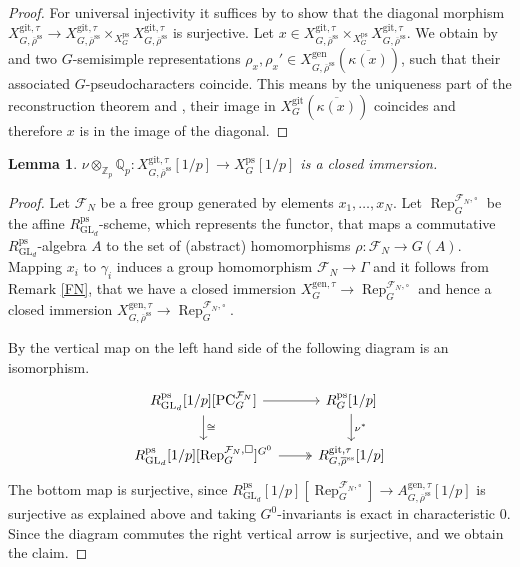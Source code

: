 \documentclass{amsart}
\newtheorem{lem}[prop]{Lemma}
\theoremstyle{definition}
\theoremstyle{remark}
\newcommand{\stackcite}[1]{\cite[\href{https://stacks.math.columbia.edu/tag/#1}{Tag #1}]{stacks-project}}
\DeclareMathOperator{\GL}{GL}
\DeclareMathOperator{\Rep}{Rep}
\newcommand{\Qp}{\mathbb {Q}_p}
\newcommand{\Zp}{\mathbb{Z}_p}
\newcommand{\rhobar}{\overline{\rho}}
\newcommand{\ps}{\mathrm{ps}}
\newcommand{\gen}{\mathrm{gen}}
\newcommand{\gps}{\mathrm{git}}
\newcommand{\RpsGLd}{R^{\ps}_{\GL_d}}
\newcommand{\XgpsG}{X^{\gps}_{G}}
\newcommand{\rhobarss}{\rhobar^{\mathrm{ss}}}
\newcommand{\PC}{\mathrm{PC}}
\begin{document}
\begin{proof}
    For universal injectivity it suffices by \stackcite{01S4} to show that the diagonal morphism $X^{\gps,\tau}_{G,\rhobarss} \to X^{\gps,\tau}_{G,\rhobarss} \times_{X^{\ps}_G} X^{\gps,\tau}_{G,\rhobarss}$ is surjective. Let $x \in X^{\gps,\tau}_{G,\rhobarss} \times_{X^{\ps}_G} X^{\gps,\tau}_{G,\rhobarss}$. We obtain by  and  two $G$-semisimple representations $\rho_x, \rho_x' \in X^{\gen}_{G, \rhobarss}(\overline{\kappa(x)})$, such that their associated $G$-pseudocharacters coincide. This means by the uniqueness part of the reconstruction theorem  and , their image in $\XgpsG(\overline{\kappa(x)})$ coincides and therefore $x$ is in the image of the diagonal.
\end{proof}

\begin{lem}\label{nu_cl_im}
    $\nu \otimes_{\Zp} \Qp : X^{\gps,\tau}_{G,\rhobarss}[1/p] \to X^{\ps}_G[1/p]$ is a closed immersion.
\end{lem}

\begin{proof} Let $\mathcal F_N$ be a free group generated by elements $x_1, \ldots, x_N$. 
Let $\Rep_G^{\mathcal F_N, \square}$ be the affine $\RpsGLd$-scheme, which represents the functor, that maps a commutative $\RpsGLd$-algebra 
$A$ to the set of (abstract) homomorphisms $\rho : \mathcal F_N \to G(A)$. Mapping $x_i$ to $\gamma_i$ induces 
a group homomorphism $\mathcal F_N\rightarrow \Gamma$ and it follows from Remark \ref{FN},
that we have a closed immersion $X^{\gen,\tau}_G \rightarrow \Rep_G^{\mathcal F_N, \square}$ and hence
a closed immersion $X^{\gen,\tau}_{G, \rhobarss} \rightarrow \Rep_G^{\mathcal F_N, \square}$.

By \cite[Proposition 2.11 (i)]{emerson2023comparison} the vertical map on the left hand side of the following diagram is an isomorphism.
    \begin{equation}\label{diagramclimm}
    \begin{tikzcd}
        \RpsGLd[1/p][\PC_G^{\mathcal F_N}] \dar{\cong} \rar & R^{\ps}_G[1/p] \dar{\nu^*} \\
        \RpsGLd[1/p][\Rep_G^{\mathcal F_N, \square}]^{G^0} \rar[two heads] & R^{\gps,\tau}_{G,\rhobarss}[1/p]
    \end{tikzcd}
    \end{equation}
    The bottom map is surjective, since $\RpsGLd[1/p][\Rep_G^{\mathcal F_N, \square}] \to A^{\gen,\tau}_{G,\rhobarss}[1/p]$ is surjective as explained above and taking $G^0$-invariants is exact in characteristic $0$.
    Since the diagram commutes the right vertical arrow is surjective, and we obtain the claim. 
\end{proof}
\end{document}
